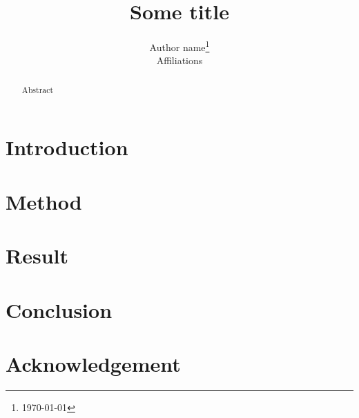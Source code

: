 \documentclass{article}
\title{Some title}
\author{
    Author name\thanks{\today} \\
    Affiliations \\
}
\begin{document}
\maketitle

\begin{abstract}
Abstract
\end{abstract}

\section{Introduction}



\section{Method}



\section{Result}



\section{Conclusion}



\section*{Acknowledgement}


\printbibliography
\end{document}
